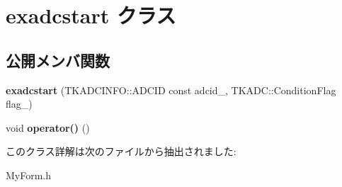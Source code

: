 \hypertarget{classexadcstart}{}\section{exadcstart クラス}
\label{classexadcstart}
\subsection*{公開メンバ関数}
\begin{DoxyCompactItemize}
\item 
\mbox{\label{classexadcstart_a84b10f86141516a571d8a41180937328}} 
{\bfseries exadcstart} (T\+K\+A\+D\+C\+I\+N\+F\+O\+::\+A\+D\+C\+ID const adcid\+\_\+, T\+K\+A\+D\+C\+::\+Condition\+Flag flag\+\_\+)
\item 
\mbox{\label{classexadcstart_aaf643294d3a2081a502affb98baf7d8d}} 
void {\bfseries operator()} ()
\end{DoxyCompactItemize}


このクラス詳解は次のファイルから抽出されました\+:\begin{DoxyCompactItemize}
\item 
My\+Form.\+h\end{DoxyCompactItemize}
